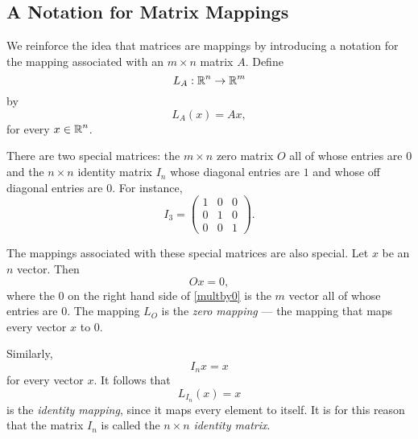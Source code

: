 \documentclass{ximera}
\begin{document}
\subsection*{A Notation for Matrix Mappings}

We reinforce the idea that matrices are mappings by introducing a notation 
for the mapping associated with an $m\times n$ matrix $A$.  Define
\[
L_A:\mbox{$\Bbb{R}$}^n\to\mbox{$\Bbb{R}$}^m
\]
by
\[
L_A(x) = Ax,
\]
for every $x\in\mbox{$\Bbb{R}$}^n$.

There are two special matrices:  the $m\times n$ zero matrix 
 $O$ all of whose entries are $0$ and the 
$n\times n$ identity matrix  $I_n$ whose diagonal 
entries are $1$ and whose off diagonal entries are $0$.  For instance,
\[
	I_3 = \left(
\begin{array}{rrr}
 1 & 0 & 0  \\
 0 & 1 & 0  \\
 0 & 0 & 1
\end{array}
\right).
\]

The mappings associated with these special matrices are also special.  
Let $x$ be an $n$ vector.  Then
\begin{equation} \label{multby0}
Ox=0,
\end{equation}
where the $0$ on the right hand side of \eqref{multby0} is the $m$
vector all of whose entries are $0$.  The mapping $L_O$ is the 
{\em zero mapping\/}  --- the mapping 
that maps every vector $x$ to $0$.

Similarly,
\[
I_nx=x
\]
for every vector $x$.  It follows that
\[
L_{I_n}(x) = x
\]
is the {\em identity mapping\/},  since
it maps every element to itself.  It is for this reason that the
matrix $I_n$ is called the $n\times n$ {\em identity matrix\/}.

\EXER

\TEXER
\end{document}
